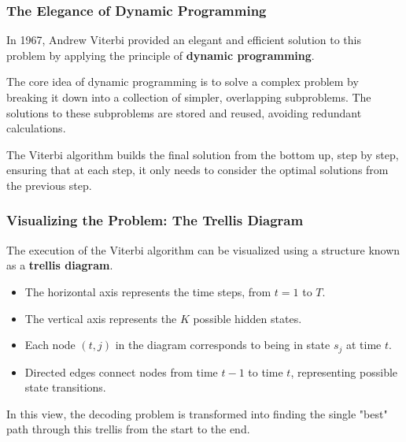 \documentclass[aspectratio=43, 9pt]{beamer}
\begin{document}
\begin{frame}
    \frametitle{The Elegance of Dynamic Programming}
    In 1967, Andrew Viterbi provided an elegant and efficient solution to this problem by applying the principle of \textbf{dynamic programming}.
    
    \vspace{1em}
    
    The core idea of dynamic programming is to solve a complex problem by breaking it down into a collection of simpler, overlapping subproblems. The solutions to these subproblems are stored and reused, avoiding redundant calculations.
    
    The Viterbi algorithm builds the final solution from the bottom up, step by step, ensuring that at each step, it only needs to consider the optimal solutions from the previous step.
\end{frame}

\begin{frame}
    \frametitle{Visualizing the Problem: The Trellis Diagram}
    The execution of the Viterbi algorithm can be visualized using a structure known as a \textbf{trellis diagram}.
    
    \begin{itemize}
        \item The horizontal axis represents the time steps, from $t=1$ to $T$.
        \item The vertical axis represents the $K$ possible hidden states.
        \item Each node $(t, j)$ in the diagram corresponds to being in state $s_j$ at time $t$.
        \item Directed edges connect nodes from time $t-1$ to time $t$, representing possible state transitions.
    \end{itemize}
    
    \vspace{1em}
    
    In this view, the decoding problem is transformed into finding the single "best" path through this trellis from the start to the end.
\end{frame}
\end{document}
